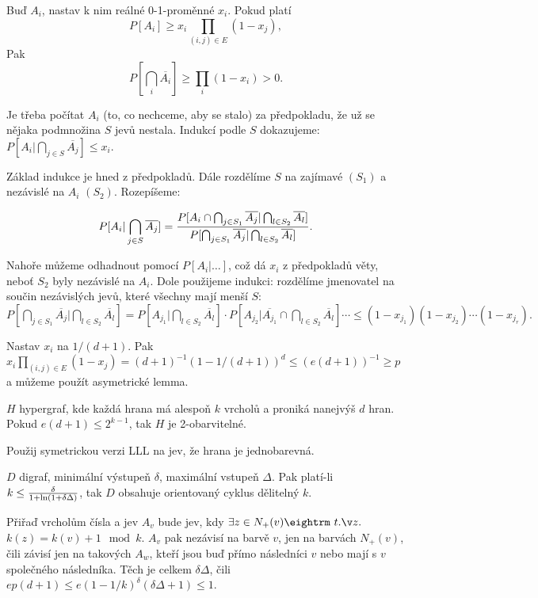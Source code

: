  Buď $A_i$, nastav k nim reálné 0-1-proměnné $x_i$. Pokud platí
$$P[A_i] \ge x_i \prod_{(i,j) \in E} (1-x_j), $$
Pak
$$P[\bigcap_i \overline{A_i}] \ge \prod_i (1-x_i) > 0.$$

\prf{} Je třeba počítat $A_i$ (to, co nechceme, aby se stalo) za předpokladu, že
už se nějaka podmnožina $S$ jevů nestala. Indukcí podle $S$ dokazujeme: $ P[A_i|\bigcap_{j \in S} \overline{A_j}] \le x_i.$

Základ indukce je hned z předpokladů. Dále rozdělíme $S$ na zajímavé $(S_1)$ a nezávislé na $A_i$ $(S_2)$.
Rozepíšeme:

$$P[A_i | \bigcap_{j \in S} \overline{A_j}] =
{P[A_i \cap \bigcap_{j \in S_1} \overline{A_j} | \bigcap_{l \in S_2} \overline{A_l}] \over
 P[\bigcap_{j \in S_1} \overline{A_j} | \bigcap_{l \in S_2} \overline{A_l}]}.
$$

Nahoře můžeme odhadnout pomocí $P[A_i | \dots]$, což dá $x_i$ z předpokladů věty,
neboť $S_2$ byly nezávislé na $A_i$. Dole použijeme indukci: rozdělíme jmenovatel
na součin nezávislých jevů, které všechny mají menší $S$:
$P[\bigcap_{j \in S_1} \overline{A_j} | \bigcap_{l \in S_2} \overline{A_l}] = 
P[A_{j_1} | \bigcap_{l \in S_2} \overline{A_l}] \cdot P[A_{j_2} | \overline{A_{j_1}} \cap \bigcap_{l \in S_2} \overline{A_l}] \cdots
\le (1-x_{j_1})(1-x_{j_2}) \cdots (1-x_{j_r}).$

 Nastav $x_i$ na $1/(d+1)$. Pak $x_i \prod_{(i,j) \in E} (1-x_j) = (d+1)^{-1} \left( 1 - 1/(d+1)\right)^{d} \le (e(d+1))^{-1}
\ge p$ a můžeme použít asymetrické lemma.


 $H$ hypergraf, kde každá hrana má alespoň $k$ vrcholů
a proniká nanejvýš $d$ hran. Pokud $e(d+1) \le 2^{k-1}$, tak $H$ je 2-obarvitelné.

\prf{} Použij symetrickou verzi LLL na jev, že hrana je jednobarevná.

 $D$ digraf, minimální výstupeň $\delta$, maximální vstupeň
$\Delta$. Pak platí-li $k \le {\delta \over 1 + \ln(1+\delta\Delta)}$, tak $D$ obsahuje
orientovaný cyklus dělitelný $k$.

\prf{} Přiřaď vrcholům čísla a jev $A_v$ bude jev, kdy $\exists z \in N_+(v) \st$ $k(z) = k(v) +1 \mod k$.
$A_v$ pak nezávisí na barvě $v$, jen na barvách $N_+(v)$, čili závisí jen na takových $A_w$, kteří jsou
buď přímo následníci $v$ nebo mají s $v$ společného následníka. Těch je celkem $\delta \Delta$, čili
$ep(d+1) \le e(1-1/k)^\delta (\delta \Delta + 1) \le 1$.

